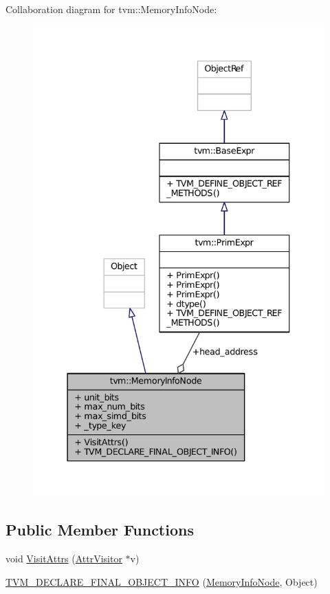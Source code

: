 Collaboration diagram for tvm\+:\+:Memory\+Info\+Node\+:
\nopagebreak
\begin{figure}[H]
\begin{center}
\leavevmode
\includegraphics[width=337pt]{classtvm_1_1MemoryInfoNode__coll__graph}
\end{center}
\end{figure}
\subsection*{Public Member Functions}
\begin{DoxyCompactItemize}
\item 
void \hyperlink{classtvm_1_1MemoryInfoNode_a93ff1429c6382dc4d17bf91d8dad5e81}{Visit\+Attrs} (\hyperlink{classtvm_1_1AttrVisitor}{Attr\+Visitor} $\ast$v)
\item 
\hyperlink{classtvm_1_1MemoryInfoNode_a76cbbfb90ec0f5deeeb10171430a0ccb}{T\+V\+M\+\_\+\+D\+E\+C\+L\+A\+R\+E\+\_\+\+F\+I\+N\+A\+L\+\_\+\+O\+B\+J\+E\+C\+T\+\_\+\+I\+N\+FO} (\hyperlink{classtvm_1_1MemoryInfoNode}{Memory\+Info\+Node}, Object)
\end{DoxyCompactItemize}
